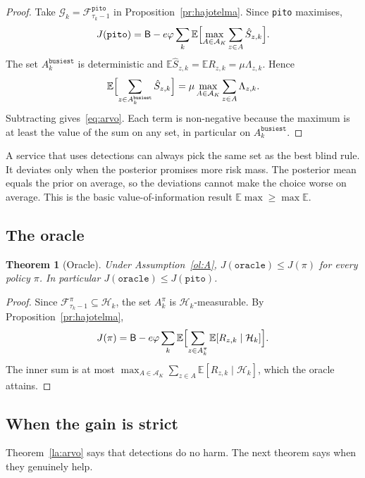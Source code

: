 \documentclass[11pt,a4paper]{article}
\theoremstyle{plain}
\newtheorem{lause}{Theorem}
\theoremstyle{definition}
\theoremstyle{remark}
\newcommand{\E}{\mathbb{E}}
\newcommand{\cF}{\mathcal{F}}
\newcommand{\cG}{\mathcal{G}}
\newcommand{\cH}{\mathcal{H}}
\newcommand{\cA}{\mathcal{A}}
\newcommand{\1}{\mathbf{1}}
\newcommand{\pol}[1]{\texttt{#1}}
\begin{document}
\begin{proof}
Take $\cG_k = \cF^{\pol{pito}}_{\tau_k - 1}$ in Proposition~\ref{pr:hajotelma}.
Since \pol{pito} maximises,
\[
  J(\pol{pito}) = \mathsf{B} - e\varphi \sum_k \E\Bigl[\max_{A \in \cA_K}\sum_{z \in A}\hat S_{z,k}\Bigr].
\]
The set $A^{\pol{busiest}}_k$ is deterministic and
$\E \hat S_{z,k} = \E R_{z,k} = \mu \Lambda_{z,k}$. Hence
\[
  \E\Bigl[\sum_{z \in A^{\pol{busiest}}_k} \hat S_{z,k}\Bigr] = \mu \max_{A \in \cA_K}\sum_{z \in A}\Lambda_{z,k}.
\]
Subtracting gives~\eqref{eq:arvo}. Each term is non-negative because the maximum
is at least the value of the sum on any set, in particular on
$A^{\pol{busiest}}_k$.
\end{proof}

\begin{intuitio}
A service that uses detections can always pick the same set as the best blind
rule. It deviates only when the posterior promises more risk mass. The posterior
mean equals the prior on average, so the deviations cannot make the choice worse
on average. This is the basic value-of-information result $\E \max \ge \max \E$.
\end{intuitio}

\subsection{The oracle}

\begin{lause}[Oracle]\label{la:oraakkeli}
Under Assumption~\ref{ol:A}, $J(\pol{oracle}) \le J(\pi)$ for every policy $\pi$.
In particular $J(\pol{oracle}) \le J(\pol{pito})$.
\end{lause}

\begin{proof}
Since $\cF^\pi_{\tau_k - 1} \subseteq \cH_k$, the set $A^\pi_k$ is
$\cH_k$-measurable. By Proposition~\ref{pr:hajotelma},
\[
  J(\pi) = \mathsf{B} - e\varphi\sum_k \E\Bigl[\sum_{z \in A^\pi_k}\E[R_{z,k}\mid\cH_k]\Bigr].
\]
The inner sum is at most
$\max_{A \in \cA_K}\sum_{z \in A}\E[R_{z,k}\mid\cH_k]$, which the oracle attains.
\end{proof}

\subsection{When the gain is strict}

Theorem~\ref{la:arvo} says that detections do no harm. The next theorem says
when they genuinely help.
\end{document}
